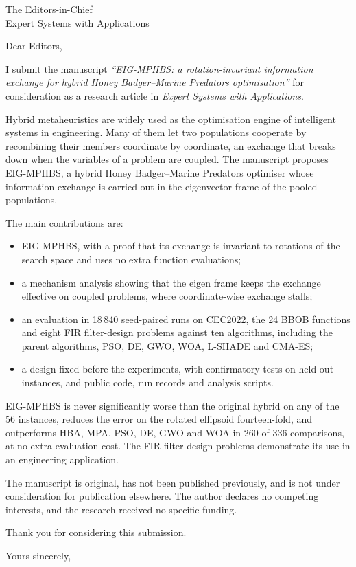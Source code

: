\documentclass[11pt]{letter}
\date{\today}
\begin{document}
\begin{letter}{The Editors-in-Chief\\Expert Systems with Applications}

\opening{Dear Editors,}

I submit the manuscript \emph{``EIG-MPHBS: a rotation-invariant information exchange for hybrid Honey Badger--Marine
Predators optimisation''} for consideration as a research article in \emph{Expert Systems with Applications}.

Hybrid metaheuristics are widely used as the optimisation engine of intelligent systems in engineering. Many of them let
two populations cooperate by recombining their members coordinate by coordinate, an exchange that breaks down when the
variables of a problem are coupled. The manuscript proposes EIG-MPHBS, a hybrid Honey Badger--Marine Predators optimiser
whose information exchange is carried out in the eigenvector frame of the pooled populations.

The main contributions are:
\begin{itemize}
\item EIG-MPHBS, with a proof that its exchange is invariant to rotations of the search space and uses no extra
  function evaluations;
\item a mechanism analysis showing that the eigen frame keeps the exchange effective on coupled problems, where
  coordinate-wise exchange stalls;
\item an evaluation in 18\,840 seed-paired runs on CEC2022, the 24 BBOB functions and eight FIR filter-design problems
  against ten algorithms, including the parent algorithms, PSO, DE, GWO, WOA, L-SHADE and CMA-ES;
\item a design fixed before the experiments, with confirmatory tests on held-out instances, and public code, run
  records and analysis scripts.
\end{itemize}

EIG-MPHBS is never significantly worse than the original hybrid on any of the 56 instances, reduces the error on the
rotated ellipsoid fourteen-fold, and outperforms HBA, MPA, PSO, DE, GWO and WOA in 260 of 336 comparisons, at no extra
evaluation cost. The FIR filter-design problems demonstrate its use in an engineering application.

The manuscript is original, has not been published previously, and is not under consideration for publication
elsewhere. The author declares no competing interests, and the research received no specific funding.

Thank you for considering this submission.

\closing{Yours sincerely,}

\end{letter}
\end{document}
